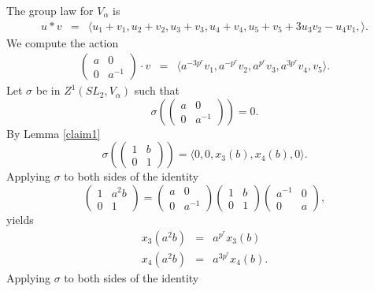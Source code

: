 \begin{example}
	The group law for $V_\alpha$ is
	\begin{eqnarray*}
		u * v &=&
		\langle
		u_1 + v_1,
		u_2 + v_2,
		u_3 + v_3,
		u_4 + v_4,
		u_5 + v_5 + 3u_3v_2 - u_4v_1,
		\rangle.
	\end{eqnarray*}
		We compute the action
	\begin{eqnarray*}
		\left(\begin{matrix} a & 0 \\ 0 & a^{-1} \end{matrix}\right)\cdot v &=&
		\langle 
		a^{-3p^r}v_1,
		a^{-p^r}v_2,
		a^{p^r}v_3,
		a^{3p^r}v_4,
		v_5
		\rangle.
	\end{eqnarray*}
	Let $\sigma$ be in $Z^1(SL_2, V_\alpha)$ such that
	\begin{displaymath}
		\sigma\left(\left(\begin{matrix}a & 0\\0 & a^{-1}\end{matrix}\right)\right) = 0.
	\end{displaymath}
	By Lemma \ref{claim1}
	\begin{displaymath}
		\sigma\left(\left(\begin{matrix} 1 & b \\ 0 & 1 \end{matrix}\right)\right) =
		\langle 
		0,
		0,
		x_3(b),
		x_4(b),
		0
		\rangle.
	\end{displaymath}
	Applying $\sigma$ to both sides of the identity
	\begin{displaymath}
		\left(\begin{matrix} 1 & a^2b \\ 0 & 1 \end{matrix}\right)
		= 
		\left(\begin{matrix} a & 0 \\ 0 & a^{-1} \end{matrix}\right)
		\left(\begin{matrix} 1 & b \\ 0 & 1 \end{matrix}\right)
		\left(\begin{matrix} a^{-1} & 0 \\ 0 & a \end{matrix}\right),
	\end{displaymath}
	yields
	\begin{eqnarray*}
		x_3(a^2b) &=& a^{p^r}x_3(b)\\
		x_4(a^2b) &=& a^{3p^r}x_4(b).
	\end{eqnarray*}
	Applying $\sigma$ to both sides of the identity

\end{example}
